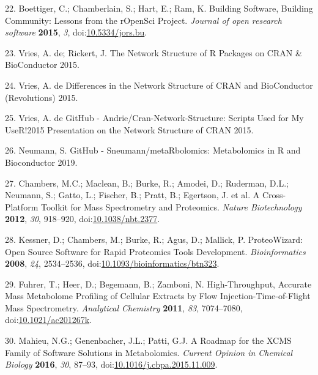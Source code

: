 \documentclass[]{article}
\begin{document}
\leavevmode\hypertarget{ref-boettiger_2015}{}%
22. Boettiger, C.; Chamberlain, S.; Hart, E.; Ram, K. Building Software, Building Community: Lessons from the rOpenSci Project. \emph{Journal of open research software} \textbf{2015}, \emph{3}, doi:\href{https://doi.org/10.5334/jors.bu}{10.5334/jors.bu}.

\leavevmode\hypertarget{ref-devries_website_2015b}{}%
23. Vries, A. de; Rickert, J. The Network Structure of R Packages on CRAN \& BioConductor 2015.

\leavevmode\hypertarget{ref-devries_website_2015a}{}%
24. Vries, A. de Differences in the Network Structure of CRAN and BioConductor (Revolutions) 2015.

\leavevmode\hypertarget{ref-devries_website_2015}{}%
25. Vries, A. de GitHub - Andrie/Cran-Network-Structure: Scripts Used for My UseR!2015 Presentation on the Network Structure of CRAN 2015.

\leavevmode\hypertarget{ref-neumann_website_2019}{}%
26. Neumann, S. GitHub - Sneumann/metaRbolomics: Metabolomics in R and Bioconductor 2019.

\leavevmode\hypertarget{ref-chambers_2012}{}%
27. Chambers, M.C.; Maclean, B.; Burke, R.; Amodei, D.; Ruderman, D.L.; Neumann, S.; Gatto, L.; Fischer, B.; Pratt, B.; Egertson, J. et al. A Cross-Platform Toolkit for Mass Spectrometry and Proteomics. \emph{Nature Biotechnology} \textbf{2012}, \emph{30}, 918--920, doi:\href{https://doi.org/10.1038/nbt.2377}{10.1038/nbt.2377}.

\leavevmode\hypertarget{ref-kessner_2008}{}%
28. Kessner, D.; Chambers, M.; Burke, R.; Agus, D.; Mallick, P. ProteoWizard: Open Source Software for Rapid Proteomics Tools Development. \emph{Bioinformatics} \textbf{2008}, \emph{24}, 2534--2536, doi:\href{https://doi.org/10.1093/bioinformatics/btn323}{10.1093/bioinformatics/btn323}.

\leavevmode\hypertarget{ref-fuhrer_2011}{}%
29. Fuhrer, T.; Heer, D.; Begemann, B.; Zamboni, N. High-Throughput, Accurate Mass Metabolome Profiling of Cellular Extracts by Flow Injection-Time-of-Flight Mass Spectrometry. \emph{Analytical Chemistry} \textbf{2011}, \emph{83}, 7074--7080, doi:\href{https://doi.org/10.1021/ac201267k}{10.1021/ac201267k}.

\leavevmode\hypertarget{ref-mahieu_2016a}{}%
30. Mahieu, N.G.; Genenbacher, J.L.; Patti, G.J. A Roadmap for the XCMS Family of Software Solutions in Metabolomics. \emph{Current Opinion in Chemical Biology} \textbf{2016}, \emph{30}, 87--93, doi:\href{https://doi.org/10.1016/j.cbpa.2015.11.009}{10.1016/j.cbpa.2015.11.009}.
\end{document}
